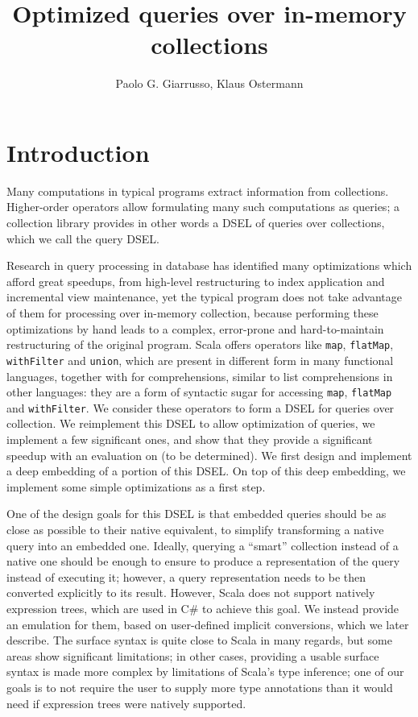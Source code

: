 \documentclass{article}
\title{Optimized queries over in-memory collections}
\author{Paolo G. Giarrusso, Klaus Ostermann}
\begin{document}
\maketitle

 \newcommand{\intersect}{\wedge}
\section{Introduction}

Many computations in typical programs extract information from
collections. Higher-order operators allow formulating many such
computations as queries; a collection library provides in other words a
DSEL of queries over collections, which we call the query DSEL.

Research in query processing in database has identified many
optimizations which afford great speedups, from high-level restructuring
to index application and incremental view maintenance, yet the typical
program does not take advantage of them for processing over in-memory
collection, because performing these optimizations by hand leads to a
complex, error-prone and hard-to-maintain restructuring of the original
program. Scala offers operators like \texttt{map}, \texttt{flatMap},
\texttt{withFilter} and \texttt{union}, which are present in different
form in many functional languages, together with for comprehensions,
similar to list comprehensions in other languages: they are a form of
syntactic sugar for accessing \texttt{map}, \texttt{flatMap} and
\texttt{withFilter}. We consider these operators to form a DSEL for
queries over collection. We reimplement this DSEL to allow optimization
of queries, we implement a few significant ones, and show that they
provide a significant speedup with an evaluation on (to be determined).
We first design and implement a deep embedding of a portion of this
DSEL. On top of this deep embedding, we implement some simple
optimizations as a first step.

One of the design goals for this DSEL is that embedded queries should be
as close as possible to their native equivalent, to simplify
transforming a native query into an embedded one. Ideally, querying a
``smart'' collection instead of a native one should be enough to ensure
to produce a representation of the query instead of executing it;
however, a query representation needs to be then converted explicitly to
its result. However, Scala does not support natively expression trees,
which are used in C\# to achieve this goal. We instead provide an
emulation for them, based on user-defined implicit conversions, which we
later describe. The surface syntax is quite close to Scala in many
regards, but some areas show significant limitations; in other cases,
providing a usable surface syntax is made more complex by limitations of
Scala's type inference; one of our goals is to not require the user to
supply more type annotations than it would need if expression trees were
natively supported.
\end{document}
